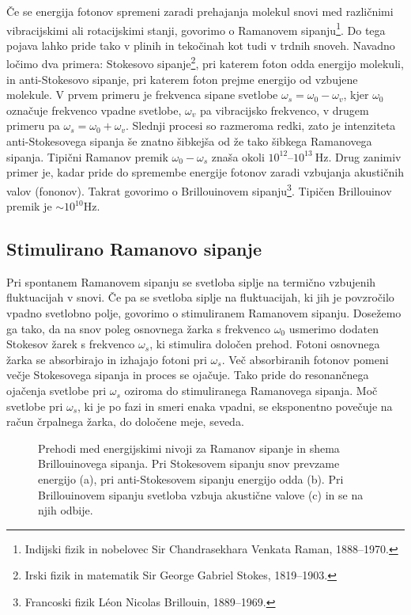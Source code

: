 Če se energija fotonov spremeni zaradi prehajanja molekul snovi med različnimi
vibracijskimi ali rotacijskimi stanji, govorimo o Ramanovem
sipanju\footnote{Indijski fizik in nobelovec Sir Chandrasekhara Venkata Raman, 1888--1970.}. 
Do tega pojava lahko pride tako v plinih in tekočinah kot tudi v trdnih snoveh. Navadno 
ločimo dva primera: Stokesovo sipanje\footnote{Irski fizik in matematik Sir George Gabriel
Stokes, 1819--1903.}, pri katerem foton odda energijo molekuli, in anti-Stokesovo sipanje,
pri katerem foton prejme energijo od vzbujene molekule. V prvem primeru je frekvenca
sipane svetlobe $\omega_s=\omega_0-\omega_v$, kjer $\omega_0$ označuje frekvenco vpadne
svetlobe, $\omega_v$ pa vibracijsko frekvenco, v drugem primeru pa $\omega_s=\omega_0+\omega_v$.
Slednji procesi so razmeroma redki, zato je intenziteta anti-Stokesovega sipanja 
še znatno šibkejša od že tako šibkega Ramanovega sipanja. Tipični Ramanov premik 
$\omega_0-\omega_s$ znaša okoli $10^{12}$--$10^{13}~\si{\hertz}$.
Drug zanimiv primer je, kadar pride do spremembe energije 
fotonov zaradi vzbujanja akustičnih valov (fononov). Takrat govorimo o Brillouinovem 
sipanju\footnote{Francoski fizik L\'eon Nicolas Brillouin, 1889--1969.}. Tipičen
Brillouinov premik je $\sim 10^{10}\si{\hertz}$. 

\subsection*{Stimulirano Ramanovo sipanje}
Pri spontanem Ramanovem sipanju se svetloba siplje na termično vzbujenih fluktuacijah
v snovi. Če pa se svetloba siplje na fluktuacijah, ki jih je povzročilo vpadno
svetlobno polje, govorimo o stimuliranem Ramanovem sipanju. Dosežemo ga tako,
da na snov poleg osnovnega žarka s frekvenco $\omega_0$ usmerimo dodaten Stokesov 
žarek s frekvenco $\omega_s$, ki stimulira določen prehod. Fotoni 
osnovnega žarka se absorbirajo in izhajajo fotoni pri $\omega_s$. Več absorbiranih fotonov
pomeni večje Stokesovega sipanja in proces se ojačuje. Tako pride do 
resonančnega ojačenja svetlobe pri $\omega_s$ oziroma do stimuliranega 
Ramanovega sipanja. Moč svetlobe pri $\omega_s$, ki je po fazi in smeri enaka vpadni, 
se eksponentno povečuje na račun črpalnega žarka, do določene meje, seveda.

\begin{figure}[h]
\centering
\def\svgwidth{140truemm} 

\caption{Prehodi med energijskimi nivoji za Ramanov sipanje in shema Brillouinovega sipanja. 
Pri Stokesovem sipanju snov prevzame energijo (a), pri anti-Stokesovem sipanju energijo odda (b).
Pri Brillouinovem sipanju svetloba vzbuja akustične valove (c) in se na njih odbije.}
\label{08_Raman}
\end{figure}

